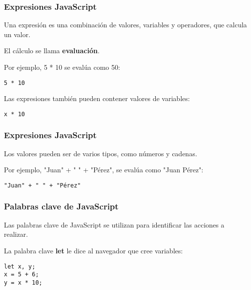 \begin{frame}[fragile]
  \frametitle{Expresiones JavaScript}

  Una expresión es una combinación de valores,
  variables y operadores, que calcula un valor.

  \vspace{\baselineskip}
  El cálculo se llama \textbf{evaluación}.

  \vspace{\baselineskip}
  Por ejemplo, 5 * 10 se evalúa como 50:

  \vspace{\baselineskip}
  \begin{lstlisting}
5 * 10
  \end{lstlisting}

  \vspace{\baselineskip}
  Las expresiones también pueden contener valores de variables:

  \vspace{\baselineskip}
  \begin{lstlisting}
x * 10
  \end{lstlisting}
\end{frame}

\begin{frame}[fragile]
  \frametitle{Expresiones JavaScript}

  \vspace{\baselineskip}
  Los valores pueden ser de varios tipos, como números y cadenas.

  \vspace{\baselineskip}
  Por ejemplo, "Juan" + " " + "Pérez", se evalúa como "Juan Pérez":

  \vspace{\baselineskip}
  \begin{lstlisting}
"Juan" + " " + "Pérez"
  \end{lstlisting}
\end{frame}

\begin{frame}[fragile]
  \frametitle{Palabras clave de JavaScript}

  Las palabras clave de JavaScript se utilizan para
  identificar las acciones a realizar.

  \vspace{\baselineskip}
  La palabra clave \textbf{let} le dice al navegador que cree variables:

  \vspace{\baselineskip}
  \begin{lstlisting}
let x, y;
x = 5 + 6;
y = x * 10;
  \end{lstlisting}
\end{frame}

